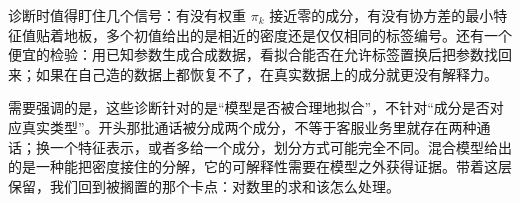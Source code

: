 诊断时值得盯住几个信号：有没有权重 \(\pi_k\) 接近零的成分，有没有协方差的最小特征值贴着地板，多个初值给出的是相近的密度还是仅仅相同的标签编号。还有一个便宜的检验：用已知参数生成合成数据，看拟合能否在允许标签置换后把参数找回来；如果在自己造的数据上都恢复不了，在真实数据上的成分就更没有解释力。

需要强调的是，这些诊断针对的是``模型是否被合理地拟合''，不针对``成分是否对应真实类型''。开头那批通话被分成两个成分，不等于客服业务里就存在两种通话；换一个特征表示，或者多给一个成分，划分方式可能完全不同。混合模型给出的是一种能把密度接住的分解，它的可解释性需要在模型之外获得证据。带着这层保留，我们回到被搁置的那个卡点：对数里的求和该怎么处理。
